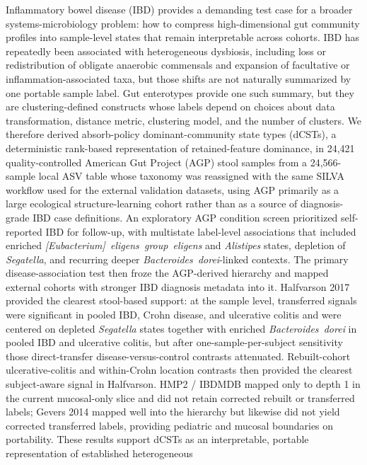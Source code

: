 \documentclass[
  11pt,
]{article}
\newcommand{\taxon}[1]{\emph{#1}}
\begin{document}
Inflammatory bowel disease (IBD) provides a demanding test case for a
broader systems-microbiology problem: how to compress high-dimensional
gut community profiles into sample-level states that remain
interpretable across cohorts. IBD has repeatedly been associated with
heterogeneous dysbiosis, including loss or redistribution of obligate
anaerobic commensals and expansion of facultative or
inflammation-associated taxa, but those shifts are not naturally
summarized by one portable sample label. Gut enterotypes provide one
such summary, but they are clustering-defined constructs whose labels
depend on choices about data transformation, distance metric, clustering
model, and the number of clusters. We therefore derived absorb-policy
dominant-community state types (dCSTs), a deterministic rank-based
representation of retained-feature dominance, in 24,421
quality-controlled American Gut Project (AGP) stool samples from a
24,566-sample local ASV table whose taxonomy was reassigned with the
same SILVA workflow used for the external validation datasets, using
AGP primarily as a large ecological structure-learning cohort rather
than as a source of diagnosis-grade IBD case definitions. An
exploratory AGP condition screen prioritized self-reported IBD for
follow-up, with multistate label-level associations that included
enriched \taxon{[Eubacterium]~eligens~group~eligens} and
\taxon{Alistipes} states, depletion of \taxon{Segatella}, and recurring
deeper \taxon{Bacteroides~dorei}-linked contexts. The primary
disease-association test then froze the AGP-derived
hierarchy and mapped external cohorts with stronger IBD diagnosis
metadata into it. Halfvarson 2017 provided the clearest stool-based
support: at the sample level, transferred signals were significant in
pooled IBD, Crohn disease, and ulcerative colitis and were centered on
depleted \taxon{Segatella} states together with enriched
\taxon{Bacteroides~dorei} in pooled IBD and ulcerative colitis, but
after one-sample-per-subject sensitivity those direct-transfer
disease-versus-control contrasts attenuated. Rebuilt-cohort
ulcerative-colitis and within-Crohn location contrasts then provided
the clearest subject-aware signal in Halfvarson. HMP2 / IBDMDB mapped
only to depth 1 in the current mucosal-only slice and did not retain
corrected rebuilt or transferred labels; Gevers 2014 mapped well into
the hierarchy but likewise did not yield corrected transferred labels,
providing pediatric and mucosal boundaries on portability. These
results support
dCSTs as
an interpretable, portable representation of established heterogeneous
\end{document}
